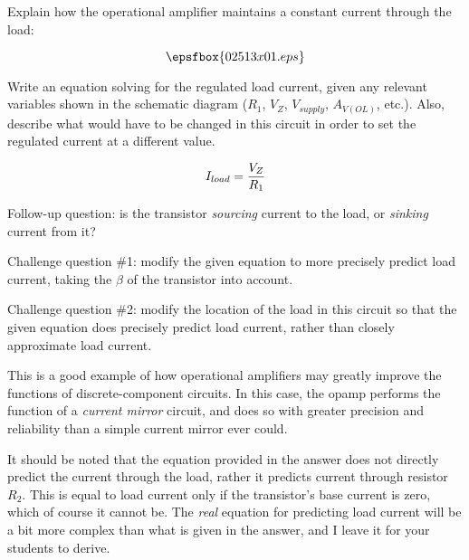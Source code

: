 

Explain how the operational amplifier maintains a constant current through the load:

$$\epsfbox{02513x01.eps}$$

Write an equation solving for the regulated load current, given any relevant variables shown in the schematic diagram ($R_1$, $V_Z$, $V_{supply}$, $A_{V(OL)}$, etc.).  Also, describe what would have to be changed in this circuit in order to set the regulated current at a different value.







$$I_{load} = {V_Z \over R_1}$$

\vskip 10pt

Follow-up question: is the transistor {\it sourcing} current to the load, or {\it sinking} current from it?

\vskip 10pt

Challenge question \#1: modify the given equation to more precisely predict load current, taking the $\beta$ of the transistor into account.

\vskip 10pt

Challenge question \#2: modify the location of the load in this circuit so that the given equation does precisely predict load current, rather than closely approximate load current.







This is a good example of how operational amplifiers may greatly improve the functions of discrete-component circuits.  In this case, the opamp performs the function of a {\it current mirror} circuit, and does so with greater precision and reliability than a simple current mirror ever could.

It should be noted that the equation provided in the answer does not directly predict the current through the load, rather it predicts current through resistor $R_2$.  This is equal to load current only if the transistor's base current is zero, which of course it cannot be.  The {\it real} equation for predicting load current will be a bit more complex than what is given in the answer, and I leave it for your students to derive.




